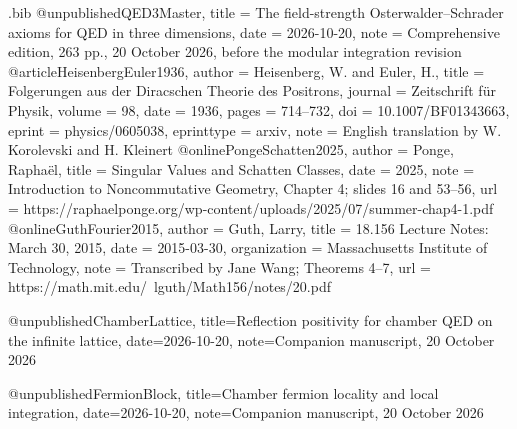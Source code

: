 \begin{filecontents*}[overwrite]{\jobname.bib}
@unpublished{QED3Master,
  title = {The field-strength {Osterwalder--Schrader} axioms for {QED} in three dimensions},
  date = {2026-10-20},
  note = {Comprehensive edition, 263 pp., 20 October 2026, before the modular integration revision}
}
@article{HeisenbergEuler1936,
  author = {Heisenberg, W. and Euler, H.},
  title = {Folgerungen aus der {Diracschen} Theorie des Positrons},
  journal = {Zeitschrift f{\"u}r Physik},
  volume = {98},
  date = {1936},
  pages = {714--732},
  doi = {10.1007/BF01343663},
  eprint = {physics/0605038},
  eprinttype = {arxiv},
  note = {English translation by W. Korolevski and H. Kleinert}
}
@online{PongeSchatten2025,
  author = {Ponge, Rapha{\"e}l},
  title = {Singular Values and Schatten Classes},
  date = {2025},
  note = {Introduction to Noncommutative Geometry, Chapter 4; slides 16 and 53--56},
  url = {https://raphaelponge.org/wp-content/uploads/2025/07/summer-chap4-1.pdf}
}
@online{GuthFourier2015,
  author = {Guth, Larry},
  title = {18.156 Lecture Notes: {March} 30, 2015},
  date = {2015-03-30},
  organization = {Massachusetts Institute of Technology},
  note = {Transcribed by Jane Wang; Theorems 4--7},
  url = {https://math.mit.edu/~lguth/Math156/notes/20.pdf}
}

@unpublished{ChamberLattice,
 title={Reflection positivity for chamber {QED} on the infinite lattice},
 date={2026-10-20}, note={Companion manuscript, 20 October 2026}}

@unpublished{FermionBlock,
 title={Chamber fermion locality and local integration},
 date={2026-10-20}, note={Companion manuscript, 20 October 2026}}
\end{filecontents*}
\documentclass[11pt,letterpaper,reqno]{amsart}
\makeatletter
{}[2020/10/01]

\RequirePackage[T1]{fontenc}
\RequirePackage{lmodern}
\RequirePackage{microtype}
\RequirePackage[letterpaper,margin=1in,headheight=15pt]{geometry}
\RequirePackage{amsmath,amsthm,amssymb,mathtools}
\RequirePackage{enumitem}
\RequirePackage{perpage}
\RequirePackage{xcolor}
\RequirePackage[breaklinks=true,colorlinks=true,
  linkcolor=manuscriptred,citecolor=manuscriptcyan,urlcolor=manuscriptmagenta]{hyperref}
\RequirePackage{cleveref}

